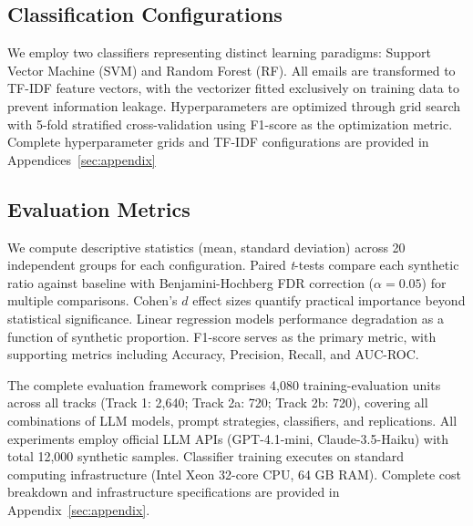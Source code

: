 \subsection{Classification Configurations}

We employ two classifiers representing distinct learning paradigms: Support Vector Machine (SVM) and Random Forest (RF). All emails are transformed to TF-IDF feature vectors, with the vectorizer fitted exclusively on training data to prevent information leakage. Hyperparameters are optimized through grid search with 5-fold stratified cross-validation using F1-score as the optimization metric. Complete hyperparameter grids and TF-IDF configurations are provided in Appendices~\ref{sec:appendix}

\subsection{Evaluation Metrics}

We compute descriptive statistics (mean, standard deviation) across 20 independent groups for each configuration. Paired \textit{t}-tests compare each synthetic ratio against baseline with Benjamini-Hochberg FDR correction ($\alpha = 0.05$) for multiple comparisons. Cohen's $d$ effect sizes quantify practical importance beyond statistical significance. Linear regression models performance degradation as a function of synthetic proportion. F1-score serves as the primary metric, with supporting metrics including Accuracy, Precision, Recall, and AUC-ROC.

The complete evaluation framework comprises 4,080 training-evaluation units across all tracks (Track 1: 2,640; Track 2a: 720; Track 2b: 720), covering all combinations of LLM models, prompt strategies, classifiers, and replications. All experiments employ official LLM APIs (GPT-4.1-mini, Claude-3.5-Haiku) with total 12,000 synthetic samples. Classifier training executes on standard computing infrastructure (Intel Xeon 32-core CPU, 64 GB RAM). Complete cost breakdown and infrastructure specifications are provided in Appendix~\ref{sec:appendix}.
